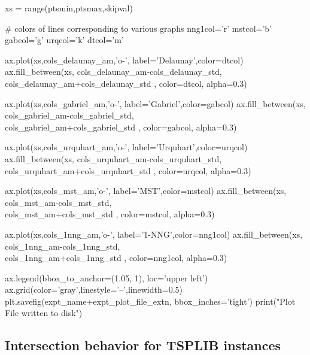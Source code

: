      xs = range(ptsmin,ptsmax,skipval)

     # colors of lines corresponding to various graphs
     nng1col='r'
     mstcol='b'
     gabcol='g'
     urqcol='k'
     dtcol='m'
 
     ax.plot(xs,cols_delaunay_am,'o-', label='Delaunay',color=dtcol)
     ax.fill_between(xs, cols_delaunay_am-cols_delaunay_std, \\
                         cols_delaunay_am+cols_delaunay_std ,  color=dtcol, alpha=0.3)     
  
     ax.plot(xs,cols_gabriel_am,'o-', label='Gabriel',color=gabcol)
     ax.fill_between(xs, cols_gabriel_am-cols_gabriel_std, \\
                         cols_gabriel_am+cols_gabriel_std ,  color=gabcol, alpha=0.3)     

     ax.plot(xs,cols_urquhart_am,'o-', label='Urquhart',color=urqcol)
     ax.fill_between(xs, cols_urquhart_am-cols_urquhart_std, \\
                         cols_urquhart_am+cols_urquhart_std ,  color=urqcol, alpha=0.3)     


     ax.plot(xs,cols_mst_am,'o-', label='MST',color=mstcol)
     ax.fill_between(xs, cols_mst_am-cols_mst_std, \\
                         cols_mst_am+cols_mst_std ,  color=mstcol, alpha=0.3)     

     ax.plot(xs,cols_1nng_am,'o-', label='1-NNG',color=nng1col)
     ax.fill_between(xs, cols_1nng_am-cols_1nng_std, \\
                         cols_1nng_am+cols_1nng_std ,  color=nng1col, alpha=0.3)     

     ax.legend(bbox_to_anchor=(1.05, 1), loc='upper left')
     ax.grid(color='gray',linestyle='--',linewidth=0.5)
     plt.savefig(expt_name+expt_plot_file_extn, bbox_inches='tight')
     print("Plot File written to disk")
\nwendcode{}\nwdocspar
     
\subsection{Intersection behavior for TSPLIB instances}






\nwenddocs{}

